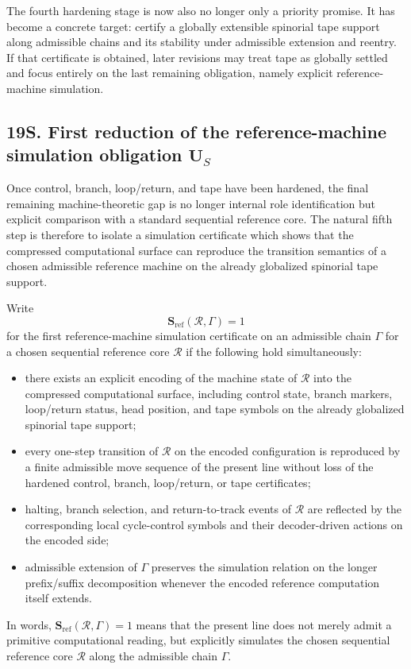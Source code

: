 \begin{corollary}
The fourth hardening stage is now also no longer only a priority promise. It has become a concrete target: certify a globally extensible spinorial tape support along admissible chains and its stability under admissible extension and reentry. If that certificate is obtained, later revisions may treat tape as globally settled and focus entirely on the last remaining obligation, namely explicit reference-machine simulation.
\end{corollary}


\subsection*{19S. First reduction of the reference-machine simulation obligation $\mathbf U_S$}
Once control, branch, loop/return, and tape have been hardened, the final remaining machine-theoretic gap is no longer internal role identification but explicit comparison with a standard sequential reference core. The natural fifth step is therefore to isolate a simulation certificate which shows that the compressed computational surface can reproduce the transition semantics of a chosen admissible reference machine on the already globalized spinorial tape support.

\begin{definition}
Write
\[
\mathbf S_{\mathrm{ref}}(\mathcal R,\Gamma)=1
\]
for the first reference-machine simulation certificate on an admissible chain $\Gamma$ for a chosen sequential reference core $\mathcal R$ if the following hold simultaneously:
\begin{itemize}[leftmargin=2em]
 \item there exists an explicit encoding of the machine state of $\mathcal R$ into the compressed computational surface, including control state, branch markers, loop/return status, head position, and tape symbols on the already globalized spinorial tape support;
 \item every one-step transition of $\mathcal R$ on the encoded configuration is reproduced by a finite admissible move sequence of the present line without loss of the hardened control, branch, loop/return, or tape certificates;
 \item halting, branch selection, and return-to-track events of $\mathcal R$ are reflected by the corresponding local cycle-control symbols and their decoder-driven actions on the encoded side;
 \item admissible extension of $\Gamma$ preserves the simulation relation on the longer prefix/suffix decomposition whenever the encoded reference computation itself extends.
\end{itemize}
In words, $\mathbf S_{\mathrm{ref}}(\mathcal R,\Gamma)=1$ means that the present line does not merely admit a primitive computational reading, but explicitly simulates the chosen sequential reference core $\mathcal R$ along the admissible chain $\Gamma$.
\end{definition}

